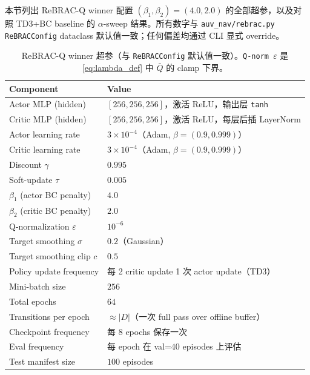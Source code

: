 本节列出 ReBRAC-Q winner 配置 $(\beta_1, \beta_2) = (4.0, 2.0)$ 的全部超参，以及对照 TD3+BC baseline 的 $\alpha$-sweep 结果。所有数字与 \texttt{auv\_nav/rebrac.py} \texttt{ReBRACConfig} dataclass 默认值一致；任何偏差均通过 CLI 显式 override。

\begin{table}[h]
\centering
\small
\caption{ReBRAC-Q winner 超参（与 \texttt{ReBRACConfig} 默认值一致）。\texttt{Q-norm $\varepsilon$} 是 \eqref{eq:lambda_def} 中 $\bar{Q}$ 的 clamp 下界。}
\label{tab:hyperparams_rebrac}
\begin{tabular}{ll}
\toprule
\textbf{Component} & \textbf{Value} \\
\midrule
Actor MLP (hidden) & $[256, 256, 256]$，激活 ReLU，输出层 \texttt{tanh} \\
Critic MLP (hidden) & $[256, 256, 256]$，激活 ReLU，每层后插 LayerNorm \\
Actor learning rate & $3 \times 10^{-4}$（Adam, $\beta=(0.9, 0.999)$） \\
Critic learning rate & $3 \times 10^{-4}$（Adam, $\beta=(0.9, 0.999)$） \\
Discount $\gamma$ & $0.995$ \\
Soft-update $\tau$ & $0.005$ \\
$\beta_1$ (actor BC penalty) & $4.0$ \\
$\beta_2$ (critic BC penalty) & $2.0$ \\
Q-normalization $\varepsilon$ & $10^{-6}$ \\
Target smoothing $\sigma$ & $0.2$（Gaussian） \\
Target smoothing clip $c$ & $0.5$ \\
Policy update frequency & 每 2 critic update 1 次 actor update（TD3） \\
Mini-batch size & $256$ \\
Total epochs & $64$ \\
Transitions per epoch & $\approx |D|$（一次 full pass over offline buffer） \\
Checkpoint frequency & 每 $8$ epochs 保存一次 \\
Eval frequency & 每 epoch 在 val=$40$ episodes 上评估 \\
Test manifest size & $100$ episodes \\
\bottomrule
\end{tabular}
\end{table}

